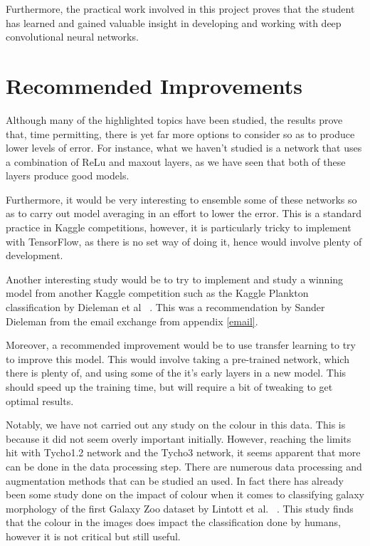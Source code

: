 \documentclass[12pt,a4paper,oneside,oldfontcommands]{memoir}
\begin{document}
\begin{Declaration Of OriginalityOrginality}
Furthermore, the practical work involved in this project proves that the student has learned and gained valuable insight in developing and working with deep convolutional neural networks.

\section{Recommended Improvements}

Although many of the highlighted topics have been studied, the results prove that, time permitting, there is yet far more options to consider so as to produce lower levels of error. For instance, what we haven't studied is a network that uses a combination of ReLu and maxout layers, as we have seen that both of these layers produce good models.

Furthermore, it would be very interesting to ensemble some of these networks so as to carry out model averaging in an effort to lower the error. This is a standard practice in Kaggle competitions, however, it is particularly tricky to implement with TensorFlow, as there is no set way of doing it, hence would involve plenty of development.

Another interesting study would be to try to implement and study a winning model from another Kaggle competition such as the Kaggle Plankton classification by Dieleman et al ~\cite{Sanders-P}. This was a recommendation by Sander Dieleman from the email exchange from appendix \ref{email}. 

Moreover, a recommended improvement would be to use transfer learning to try to improve this model. This would involve taking a pre-trained network, which there is plenty of, and using some of the it's early layers in a new model. This should speed up the training time, but will require a bit of tweaking to get optimal results. 

Notably, we have not carried out any study on the colour in this data. This is because it did not seem overly important initially. However, reaching the limits hit with Tycho1.2 network and the Tycho3 network, it seems apparent that more can be done in the data processing step. There are numerous data processing and augmentation methods that can be studied an used. In fact there has already been some study done on the impact of colour when it comes to classifying galaxy morphology of the first Galaxy Zoo dataset by Lintott et al. ~\cite{Lintott}. This study finds that the colour in the images does impact the classification done by humans, however it is not critical but still useful. 


\end{Declaration Of OriginalityOrginality}
\end{document}
